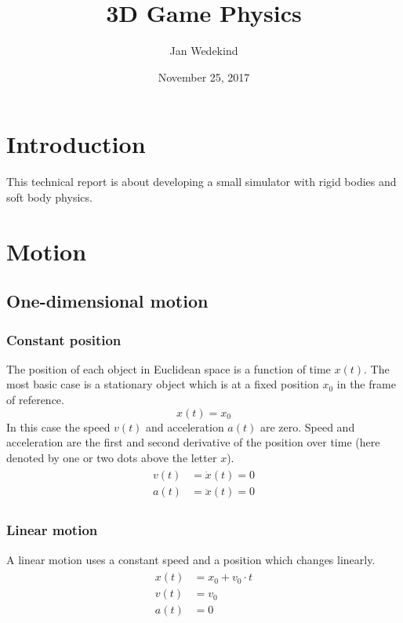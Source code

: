 \documentclass[10pt,a4paper,twoside]{article}
\title{3D Game Physics}
\author{Jan Wedekind}
\date{November 25, 2017}
\begin{document}
\maketitle

\section{Introduction}
This technical report is about developing a small simulator with rigid bodies and soft body physics.

\section{Motion}
\subsection{One-dimensional motion}
\subsubsection{Constant position}
The position of each object in Euclidean space is a function of time $x(t)$.
The most basic case is a stationary object which is at a fixed position $x_0$ in the frame of reference.
\begin{equation*}
  x(t) = x_0
\end{equation*}
In this case the speed $v(t)$ and acceleration $a(t)$ are zero.
Speed and acceleration are the first and second derivative of the position over time (here denoted by one or two dots above the letter $x$).
\begin{align*}
  \begin{split}
    v(t) & = \dot{x}(t)  = 0\\
    a(t) & = \ddot{x}(t) = 0
  \end{split}
\end{align*}

\subsubsection{Linear motion}
A linear motion uses a constant speed and a position which changes linearly.
\begin{align*}
  \begin{split}
    x(t) & = x_0 + v_0 \cdot t\\
    v(t) & = v_0\\
    a(t) & = 0
  \end{split}
\end{align*}
\end{document}
